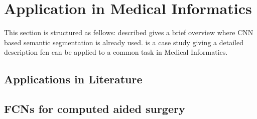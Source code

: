 \section{Application in Medical Informatics}\label{sec:application}

This section is structured as fellows:  described gives a brief overview where \gls{CNN} based semantic segmentation is already used.  is a case study giving a detailed description fcn can be applied to a common task in Medical Informatics.

\subsection{Applications in Literature} \label{sec:otherapp}



\subsection{FCNs for computed aided surgery} \label{sec:surgery}